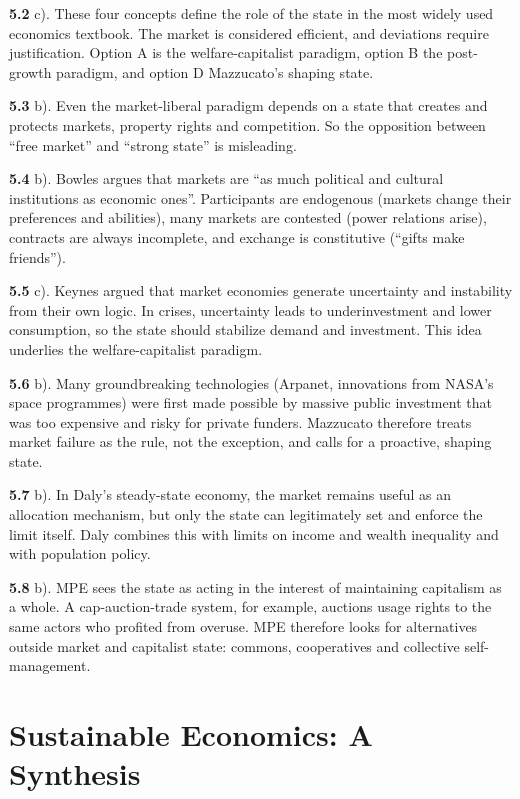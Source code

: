 \documentclass[
  british,
  a4paper,
  DIV=11,
  numbers=noendperiod,
  oneside,
  openany]{scrreprt}
\begin{document}
\textbf{5.2} c). These four concepts define the role of the state in the
most widely used economics textbook. The market is considered efficient,
and deviations require justification. Option A is the welfare-capitalist
paradigm, option B the post-growth paradigm, and option D Mazzucato's
shaping state.

\textbf{5.3} b). Even the market-liberal paradigm depends on a state
that creates and protects markets, property rights and competition. So
the opposition between ``free market'' and ``strong state'' is
misleading.

\textbf{5.4} b). Bowles argues that markets are ``as much political and
cultural institutions as economic ones''. Participants are endogenous
(markets change their preferences and abilities), many markets are
contested (power relations arise), contracts are always incomplete, and
exchange is constitutive (``gifts make friends'').

\textbf{5.5} c). Keynes argued that market economies generate
uncertainty and instability from their own logic. In crises, uncertainty
leads to underinvestment and lower consumption, so the state should
stabilize demand and investment. This idea underlies the
welfare-capitalist paradigm.

\textbf{5.6} b). Many groundbreaking technologies (Arpanet, innovations
from NASA's space programmes) were first made possible by massive public
investment that was too expensive and risky for private funders.
Mazzucato therefore treats market failure as the rule, not the
exception, and calls for a proactive, shaping state.

\textbf{5.7} b). In Daly's steady-state economy, the market remains
useful as an allocation mechanism, but only the state can legitimately
set and enforce the limit itself. Daly combines this with limits on
income and wealth inequality and with population policy.

\textbf{5.8} b). MPE sees the state as acting in the interest of
maintaining capitalism as a whole. A cap-auction-trade system, for
example, auctions usage rights to the same actors who profited from
overuse. MPE therefore looks for alternatives outside market and
capitalist state: commons, cooperatives and collective self-management.

\chapter{Sustainable Economics: A
Synthesis}\label{sustainable-economics-a-synthesis}
\end{document}
